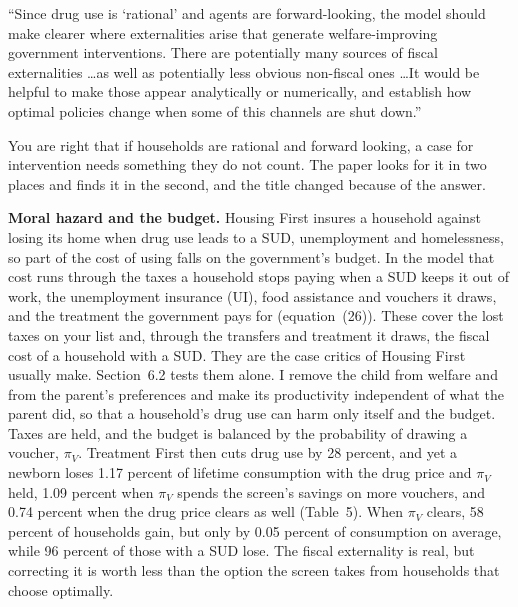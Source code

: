 \documentclass[11pt]{article}
\begin{document}
\begin{referee}
``Since drug use is `rational' and agents are forward-looking, the model should
make clearer where externalities arise that generate welfare-improving government
interventions. There are potentially many sources of fiscal externalities \dots as
well as potentially less obvious non-fiscal ones \dots It would be helpful to make
those appear analytically or numerically, and establish how optimal policies change
when some of this channels are shut down.''
\end{referee}
\begin{response}
You are right that if households are rational and forward looking, a case for
intervention needs something they do not count. The paper looks for it in two places
and finds it in the second, and the title changed because of the answer.

\textbf{Moral hazard and the budget.} Housing First insures a household against losing
its home when drug use leads to a SUD, unemployment and homelessness, so part of the
cost of using falls on the government's budget. In the model that cost runs through
the taxes a household stops paying when a SUD keeps it out of work, the unemployment
insurance (UI), food assistance and vouchers it draws, and the treatment the government
pays for (equation~(26)). These cover the lost taxes on your list and, through the
transfers and treatment it draws, the fiscal cost of a household with a SUD. They are
the case critics of Housing First usually make. Section~6.2 tests them alone. I remove
the child from welfare and from the parent's preferences and make its productivity
independent of what the parent did, so that a household's drug use can harm only
itself and the budget. Taxes are held, and the budget is balanced by the probability
of drawing a voucher, $\pi_V$. Treatment First then cuts drug use by 28 percent, and
yet a newborn loses 1.17 percent of lifetime consumption with the drug price and
$\pi_V$ held, 1.09 percent when $\pi_V$ spends the screen's savings on more vouchers,
and 0.74 percent when the drug price clears as well (Table~5). When $\pi_V$ clears, 58
percent of households gain, but only by 0.05 percent of consumption on average, while
96 percent of those with a SUD lose. The fiscal externality is real, but correcting it
is worth less than the option the screen takes from households that choose optimally.


\end{response}
\end{document}
